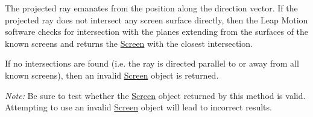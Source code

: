 The projected ray emanates from the position along the direction vector. If the projected ray does not intersect any screen surface directly, then the Leap Motion software checks for intersection with the planes extending from the surfaces of the known screens and returns the \hyperlink{class_leap_1_1_screen}{Screen} with the closest intersection.


\begin{DoxyCodeInclude}
\end{DoxyCodeInclude}


If no intersections are found (i.\+e. the ray is directed parallel to or away from all known screens), then an invalid \hyperlink{class_leap_1_1_screen}{Screen} object is returned.

{\itshape Note\+:} Be sure to test whether the \hyperlink{class_leap_1_1_screen}{Screen} object returned by this method is valid. Attempting to use an invalid \hyperlink{class_leap_1_1_screen}{Screen} object will lead to incorrect results.


